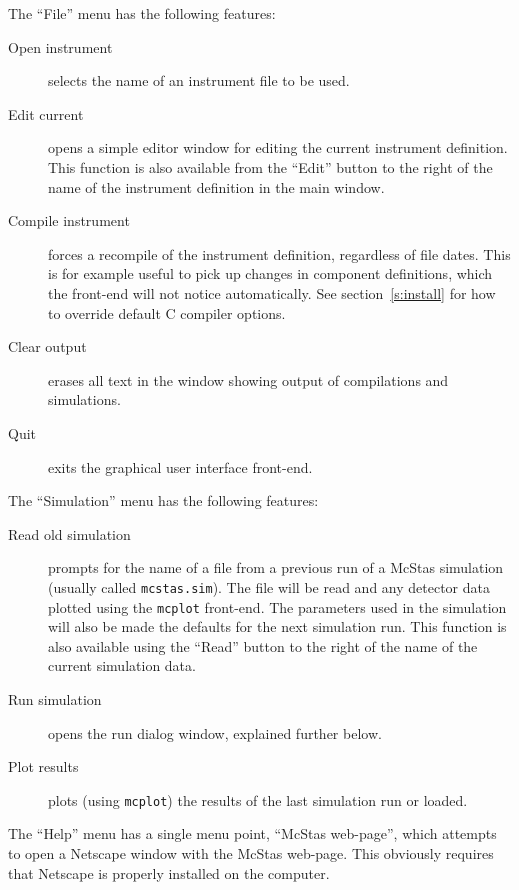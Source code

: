The ``File'' menu has the following features:
\begin{description}
\item[Open instrument] selects the name of an instrument file to be used.
\item[Edit current] opens a simple editor window for editing the
  current instrument definition. This function is also available from
  the ``Edit'' button to the right of the name of the instrument definition in
  the main window.
\item[Compile instrument] forces a recompile of the instrument
  definition, regardless of file dates. This is for example useful to
  pick up changes in component definitions, which the front-end will not
  notice automatically. See section~\ref{s:install} for how to override
  default C compiler options.
\item[Clear output] erases all text in the window showing output of
  compilations and simulations.
\item[Quit] exits the graphical user interface front-end.
\end{description}

\noindent The ``Simulation'' menu has the following features:
\begin{description}
\item[Read old simulation] prompts for the name of a file
  from a previous run of a McStas simulation (usually called
  \verb+mcstas.sim+). The file will be read and any detector data
  plotted using the \verb+mcplot+ front-end. The parameters used in the
  simulation will also be made the defaults for the next simulation
  run. This function is also available using the ``Read'' button to the
  right of the name of the current simulation data.
\item[Run simulation] opens the run dialog window, explained
  further below.
\item[Plot results] plots (using \verb+mcplot+) the results of the
  last simulation run or loaded.
\end{description}

The ``Help'' menu has a single menu point, ``McStas web-page'', which
attempts to open a Netscape window with the McStas web-page. This
obviously requires that Netscape is properly installed on the computer.


